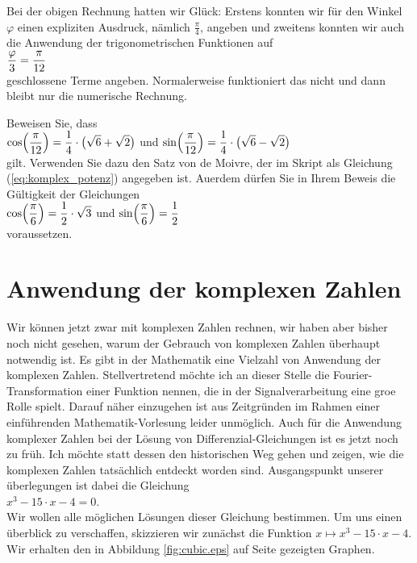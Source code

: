 \remark
Bei der obigen Rechnung hatten wir Gl\"{u}ck:  Erstens konnten wir f\"{u}r den Winkel $\varphi$ einen expliziten
Ausdruck, n\"{a}mlich $\frac{\pi}{4}$, angeben und zweitens konnten wir auch die Anwendung der trigonometrischen
Funktionen auf
\\[0.2cm]
\hspace*{1.3cm}
$\displaystyle\frac{\varphi}{3} = \frac{\pi}{12}$ 
\\[0.2cm]
geschlossene Terme angeben.  Normalerweise
funktioniert das nicht und dann bleibt nur die numerische Rechnung. 

\exercise
Beweisen Sie, dass 
\\[0.2cm]
\hspace*{1.3cm}
$\displaystyle\cos\Bigl(\frac{\pi}{12}\Bigr) = \frac{1}{4} \cdot \bigl(\sqrt{6} + \sqrt{2}\bigr)$ \quad und \quad
$\displaystyle\sin\Bigl(\frac{\pi}{12}\Bigr) = \frac{1}{4} \cdot \bigl(\sqrt{6} - \sqrt{2}\bigr)$
\\[0.2cm]
gilt.  Verwenden Sie dazu den Satz von de Moivre, der im Skript als Gleichung
(\ref{eq:komplex_potenz}) angegeben ist. 
Au\3erdem d\"{u}rfen Sie in Ihrem Beweis die G\"{u}ltigkeit der Gleichungen
\\[0.2cm]
\hspace*{1.3cm}
$\displaystyle\cos\Bigl(\frac{\pi}{6}\Bigr) = \frac{1}{2}\cdot\sqrt{3}$ \quad und \quad $\displaystyle\sin\Bigl(\frac{\pi}{6}\Bigr) = \frac{1}{2}$
\\[0.2cm]
voraussetzen.
\exend

\section{Anwendung der komplexen Zahlen}
Wir k\"{o}nnen jetzt zwar mit komplexen Zahlen rechnen, wir haben aber bisher noch nicht gesehen, warum der 
Gebrauch von komplexen Zahlen \"{u}berhaupt notwendig ist.  Es gibt in der Mathematik eine Vielzahl von
Anwendung der komplexen Zahlen.  Stellvertretend m\"{o}chte ich an dieser Stelle die Fourier-Transformation
einer Funktion nennen, die in der Signalverarbeitung eine gro\3e Rolle spielt.  Darauf n\"{a}her einzugehen
ist aus Zeitgr\"{u}nden im Rahmen einer einf\"{u}hrenden Mathematik-Vorlesung leider unm\"{o}glich.  Auch f\"{u}r die
Anwendung komplexer Zahlen bei der L\"{o}sung von Differenzial-Gleichungen ist es jetzt noch zu fr\"{u}h.  Ich
m\"{o}chte statt dessen den historischen Weg gehen und zeigen, wie die komplexen Zahlen tats\"{a}chlich entdeckt
worden sind.  Ausgangspunkt unserer \"{u}berlegungen ist dabei die Gleichung
\\[0.2cm]
\hspace*{1.3cm}
$x^3 - 15 \cdot x - 4 = 0$.
\\[0.2cm]
Wir wollen alle m\"{o}glichen L\"{o}sungen dieser Gleichung bestimmen.  Um uns einen \"{u}berblick zu verschaffen,
skizzieren wir zun\"{a}chst die Funktion $x \mapsto x^3 - 15 \cdot x - 4$.  Wir erhalten den in Abbildung
\ref{fig:cubic.eps} auf Seite \pageref{fig:cubic.eps} gezeigten Graphen.

